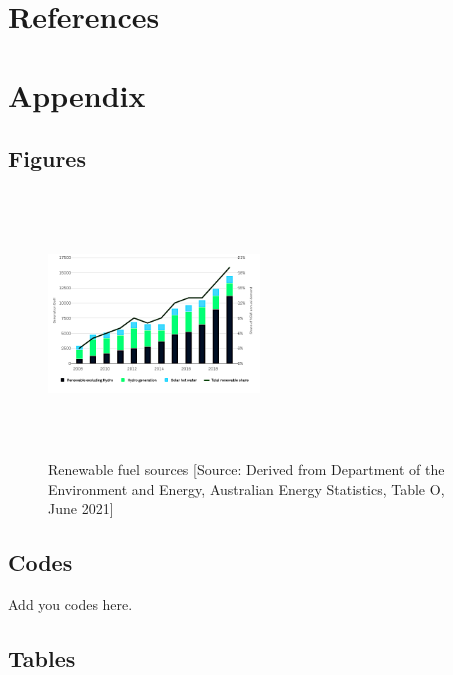\documentclass[mstat,12pt]{unswthesis}
\begin{document}
\chapter*{References}\label{references}

 


\chapter*{Appendix}\label{appendix}

\section*{\texorpdfstring{\textbf{Figures}}{Figures}}\label{figures}

\begin{figure}[H]
\centering
\includegraphics[width=0.5\textwidth,height=7cm]{renewable_fuel_sources_chart.png}
\caption{Renewable fuel sources [Source:
Derived from Department of the Environment and Energy, Australian Energy Statistics, Table O, June 2021]}\label{renewable}
\end{figure}

\section*{\texorpdfstring{\textbf{Codes}}{Codes}}\label{codes}

Add you codes here.

\section*{\texorpdfstring{\textbf{Tables}}{Tables}}\label{tables}
\end{document}
